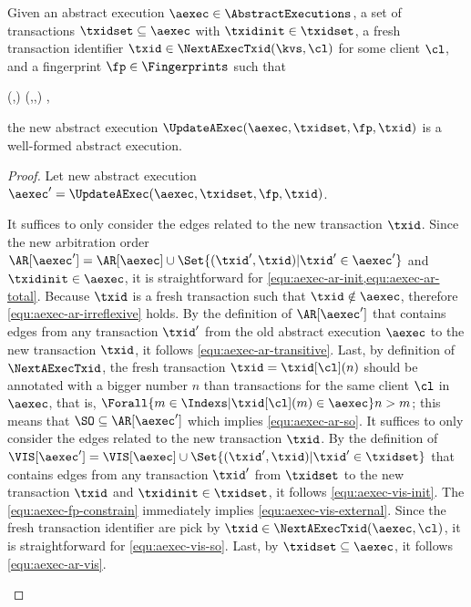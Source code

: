 \begin{toappendix}
\label{sec:proof-well-defined-update-aexec}
\end{toappendix}
\begin{propositionrep}
Given an abstract execution \( \aexec \in \AbstractExecutions \), 
a set of transactions \( \txidset \subseteq \aexec \) with \( \txidinit \in \txidset \),
a fresh transaction identifier \( \txid \in \NextAExecTxid(\kvs,\cl) \) for some client \( \cl \),
and a fingerprint \( \fp \in \Fingerprints \) such that 
\begin{Formulae}
\begin{Formula}
\Forall{\key \in \Keys | \val \in \Values } \opR(\key,\val) \in \fp 
    \implies \MaxVisTrans(\aexec,\txidset,\key) , 
\label{equ:aexec-fp-constrain}
\end{Formula}
\end{Formulae}
the new abstract execution \( \UpdateAExec(\aexec,\txidset,\fp,\txid) \) is a well-formed abstract execution.
\end{propositionrep}
\begin{proof}
Let new abstract execution \( \aexec' = \UpdateAExec(\aexec,\txidset,\fp,\txid) \).
\begin{enumerate}
    It suffices to only consider the edges related to the new transaction \( \txid \).
    Since the new arbitration order \( \AR[\aexec'] = \AR[\aexec] \cup \Set{(\txid',\txid) | \txid' \in \aexec'} \)
    and \( \txidinit \in \aexec\),
    it is straightforward for \cref{equ:aexec-ar-init,equ:aexec-ar-total}.
    Because \( \txid \) is a fresh transaction such that \( \txid \notin \aexec \), therefore \cref{equ:aexec-ar-irreflexive} holds.
    By the definition of \( \AR[\aexec'] \) that contains edges from any transaction \( \txid'\) from the old abstract execution \( \aexec \) to the new transaction \( \txid \), it follows \cref{equ:aexec-ar-transitive}.
    Last, by definition of \( \NextAExecTxid \),
    the fresh transaction \( \txid =  \txid[\cl](n) \) should be annotated with a bigger number \( n \) than 
    transactions for the same client \( \cl \) in \( \aexec \), that is,
    \( \Forall{m \in \Indexs | \txid[\cl](m) \in \aexec } n > m \);
    this means that \( \SO \subseteq \AR[\aexec'] \) which implies \cref{equ:aexec-ar-so}.
    It suffices to only consider the edges related to the new transaction \( \txid \).
    By the definition of \( \VIS[\aexec'] = \VIS[\aexec] \cup \Set{(\txid',\txid) | \txid' \in \txidset}  \) that 
    contains edges from any transaction \( \txid' \) from \( \txidset \) to the new transaction \( \txid \) 
    and \( \txidinit \in \txidset \), 
    it follows \cref{equ:aexec-vis-init}.
    The \cref{equ:aexec-fp-constrain} immediately implies \cref{equ:aexec-vis-external}.
    Since the fresh transaction identifier are pick by  \( \txid \in \NextAExecTxid(\aexec,\cl) \), 
    it is straightforward for \cref{equ:aexec-vis-so}.
    Last, by \( \txidset \subseteq \aexec \), it follows \cref{equ:aexec-ar-vis}. \qedhere
\end{enumerate}
\end{proof}

